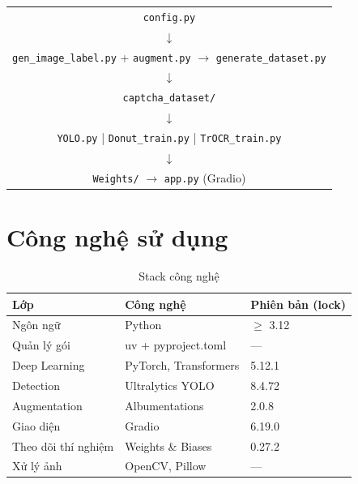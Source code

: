 \documentclass[a4paper,12pt]{report}
\begin{document}
\begin{center}
\begin{tabular}{c}
  \texttt{config.py} \\
  $\downarrow$ \\
  \texttt{gen\_image\_label.py} + \texttt{augment.py} $\rightarrow$ \texttt{generate\_dataset.py} \\
  $\downarrow$ \\
  \texttt{captcha\_dataset/} \\
  $\downarrow$ \\
  \texttt{YOLO.py} \quad | \quad \texttt{Donut\_train.py} \quad | \quad \texttt{TrOCR\_train.py} \\
  $\downarrow$ \\
  \texttt{Weights/} $\rightarrow$ \texttt{app.py} (Gradio) \\
\end{tabular}
\end{center}

\section{Công nghệ sử dụng}
\begin{table}[H]
  \centering
  \caption{Stack công nghệ}
  \begin{tabular}{lll}
    \toprule
    \textbf{Lớp} & \textbf{Công nghệ} & \textbf{Phiên bản (lock)} \\
    \midrule
    Ngôn ngữ & Python & $\geq$ 3.12 \\
    Quản lý gói & uv + pyproject.toml & --- \\
    Deep Learning & PyTorch, Transformers & 5.12.1 \\
    Detection & Ultralytics YOLO & 8.4.72 \\
    Augmentation & Albumentations & 2.0.8 \\
    Giao diện & Gradio & 6.19.0 \\
    Theo dõi thí nghiệm & Weights \& Biases & 0.27.2 \\
    Xử lý ảnh & OpenCV, Pillow & --- \\
    \bottomrule
  \end{tabular}
\end{table}
\end{document}
